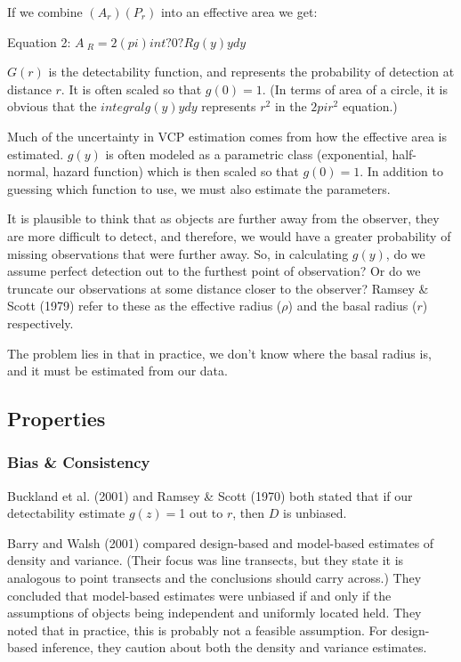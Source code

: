 \documentclass[12pt]{article}
\begin{document}
If we combine $(A_r)(P_r)$ into an effective area we get:

Equation 2: $A~_R = 2(pi) int?0?R g(y)ydy$

$G(r)$ is the detectability function, and represents the probability of detection at distance $r$. It is often scaled so that $g(0)=1$. (In terms of area of a circle, it is obvious that the $integral{g(y)ydy}$ represents $r^2$ in the $2pi r^2$ equation.)

Much of the uncertainty in VCP estimation comes from how the effective area is estimated. $g(y)$ is often modeled as a parametric class (exponential, half-normal, hazard function) which is then scaled so that $g(0)=1$. In addition to guessing which function to use, we must also estimate the parameters. 

It is plausible to think that as objects are further away from the observer, they are more difficult to detect, and therefore, we would have a greater probability of missing observations that were further away. So, in calculating $g(y)$, do we assume perfect detection out to the furthest point of observation? Or do we truncate our observations at some distance closer to the observer? Ramsey \& Scott (1979) refer to these as the effective radius ($\rho$) and the basal radius ($r$) respectively. 

The problem lies in that in practice, we don't know where the basal radius is, and it must be estimated from our data.

\subsection{Properties}
\subsubsection{Bias \& Consistency}
Buckland et al. (2001) and Ramsey \& Scott (1970) both stated that if our detectability estimate $g(z)=$1 out to $r$, then $D$ is unbiased. 

Barry and Walsh (2001) compared design-based and  model-based estimates of density and variance. (Their focus was line transects, but they state it is analogous to point transects and the conclusions should carry across.) They concluded that model-based estimates were unbiased if and only if the assumptions of objects being independent and uniformly located held. They noted that in practice, this is probably not a feasible assumption. For design-based inference, they caution about both the density and variance estimates.
\end{document}
